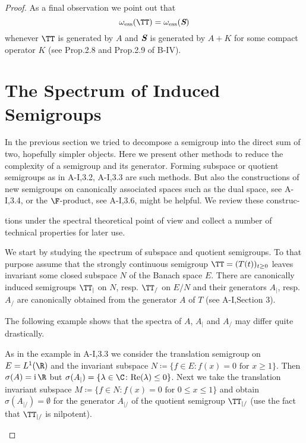 \begin{proof}
As a final observation we point out that
\begin{equation}\label{eq:a3-3.12}
\omega_{\text{ess}}(\TT) = \omega_{\text{ess}}({\textit{\textbf S}})
\end{equation}
whenever $\TT$ is generated by $A$ and ${\textit{\textbf S}}$ is generated by $A + K$ for some compact operator $K$ (see Prop.2.8 and Prop.2.9 of B-IV).

\section{The Spectrum of Induced Semigroups}\label{sec:a3-4}

In the previous section we tried to decompose a semigroup into the direct sum of two, hopefully simpler objects.
Here we present other methods to reduce the complexity of a semigroup and its generator.
Forming subspace or quotient semigroups as in A-I,3.2, A-I,3.3 are such methods.
But also the constructions of new semigroups on canonically associated spaces such as the dual space, see A-I,3.4, or the $\F$-product, see A-I,3.6, might be helpful.
We review these construc-



\newpage
tions under the spectral theoretical point of view and collect a number of technical properties for later use.

We start by studying the spectrum of subspace and quotient semigroups.
To that purpose assume that the strongly continuous semigroup $\TT = (T(t))_{t \geq 0}$ leaves invariant some closed subspace $N$ of the Banach space $E$.
There are canonically induced semigroups $\TT_{|}$ on $N$, resp. $\TT_{/}$ on $E/N$ and their generators $A_{|}$, resp. $A_{/}$ are canonically obtained from the generator $A$ of $T$ (see A-I,Section 3).

The following example shows that the spectra of $A$, $A_{|}$ and $A_{/}$ may differ quite drastically.

\begin{example}\label{ex:a3-4.1}

As in the example in A-I,3.3 we consider the translation semigroup on $E = L^{1}(\R)$ and the invariant subspace $N \coloneqq \{f \in E \colon f(x) = 0 \text{ for } x \geq 1\}$.
Then $\sigma(A) = \mathrm{i}\,\R$ but $\sigma(A_{|}) = \{\lambda \in \C \colon \text{Re}(\lambda) \leq 0\}$.
Next we take the translation invariant subspace $M \coloneqq \{f \in N \colon f(x) = 0 \text{ for } 0 \leq x \leq 1\}$ and obtain $\sigma(A_{|/}) = \emptyset$ for the generator $A_{|/}$ of the quotient semigroup $\TT_{|/}$ (use the fact that $\TT_{|/}$ is nilpotent).
\end{example}


\end{proof}
